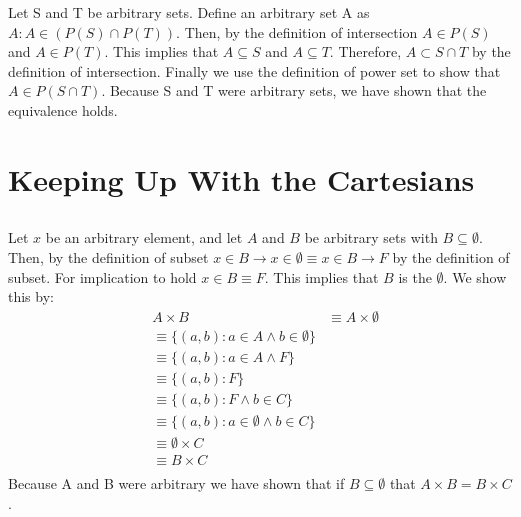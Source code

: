 \documentclass[11pt]{article}
\makeatletter
\def\imp{\rightarrow}
\renewenvironment{proof}[1][\proofname]{\par
  \normalfont \topsep6\p@\@plus6\p@\relax
  \trivlist
  \item[\hskip\labelsep
        \itshape
    #1\@addpunct{.}]\ignorespaces
}{%
  \endtrivlist\@endpefalse
}
\makeatother
\begin{document}
\subsection{} %
\begin{proof}[\textbf{Prove:} $P(S \cap T) = P(S) \cap P(T)$] \leavevmode \\
	Let S and T be arbitrary sets. Define an arbitrary set A as $A : A \in (P(S) \cap P(T))$. Then, by the definition of intersection $A \in P(S)$ and $A \in P(T)$. This implies that $A \subseteq S$ and $A \subseteq T$. Therefore, $A \subset S \cap T$ by the definition of intersection. Finally we use the definition of power set to show that $A \in P(S \cap T)$. Because S and T were arbitrary sets, we have shown that the equivalence holds. 
\end{proof}

\section{Keeping Up With the Cartesians} %
\subsection{} %
\begin{proof}[\text{Prove:} If $B \subseteq \emptyset$ then $A \times B = B \times C$] \leavevmode
	Let $x$ be an arbitrary element, and let $A$ and $B$ be arbitrary sets with $B \subseteq \emptyset$. Then, by the definition of subset $x \in B \imp x \in \emptyset \equiv x \in B \imp F$ by the definition of subset. For implication to hold $x \in B \equiv F$. This implies that $B$ is the $\emptyset$. We show this by:
	\begin{align*}
		&A \times B 
		&\equiv A \times \emptyset \tag*{Substition} \\
		&\equiv \{(a, b): a \in A \land b \in \emptyset\} \tag*{Definition Cartesian Product} \\
		&\equiv \{(a, b): a \in A \land F\} \tag*{Definition of Empty Set} \\
		&\equiv \{(a, b): F\} \tag*{Domination} \\
		&\equiv \{(a, b): F \land b \in C\} \tag*{Domination} \\
		&\equiv \{(a, b): a \in \emptyset \land b \in C\} \tag*{Def of Empty Set} \\
		&\equiv \emptyset \times C \tag*{Definition of Cartesian Product} \\
		&\equiv B \times C \tag*{Substitution} \\
	\end{align*}
	Because A and B were arbitrary we have shown that if $B \subseteq \emptyset$ that $A \times B = B \times C$.
\end{proof}
\end{document}
